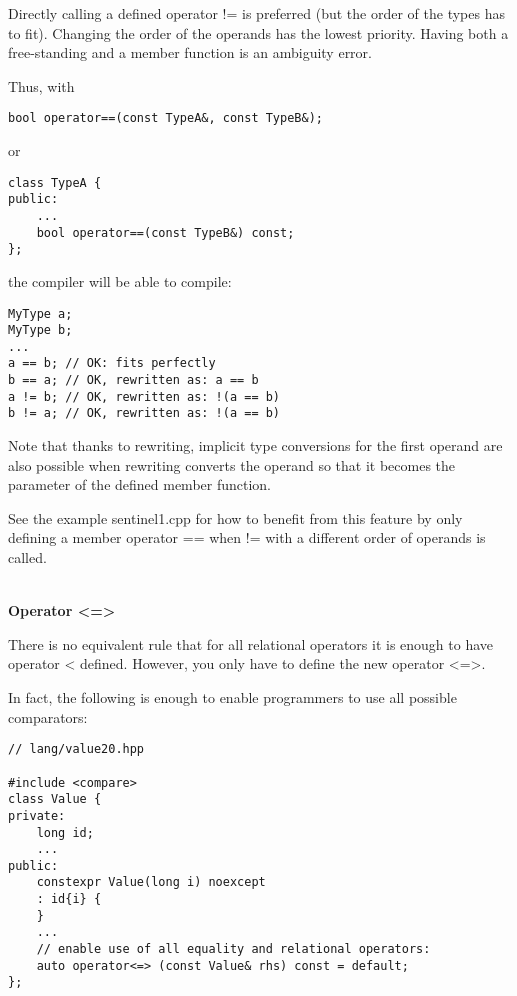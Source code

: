 Directly calling a defined operator != is preferred (but the order of the types has to fit). Changing the order of the operands has the lowest priority. Having both a free-standing and a member function is an ambiguity error.

Thus, with

\begin{lstlisting}[style=styleCXX]
bool operator==(const TypeA&, const TypeB&);
\end{lstlisting}

or

\begin{lstlisting}[style=styleCXX]
class TypeA {
public:
	...
	bool operator==(const TypeB&) const;
};
\end{lstlisting}

the compiler will be able to compile:

\begin{lstlisting}[style=styleCXX]
MyType a;
MyType b;
...
a == b; // OK: fits perfectly
b == a; // OK, rewritten as: a == b
a != b; // OK, rewritten as: !(a == b)
b != a; // OK, rewritten as: !(a == b)
\end{lstlisting}

Note that thanks to rewriting, implicit type conversions for the first operand are also possible when rewriting converts the operand so that it becomes the parameter of the defined member function.

See the example sentinel1.cpp for how to benefit from this feature by only defining a member operator == when != with a different order of operands is called.

\noindent
\hspace*{\fill} \\ %
\textbf{Operator <=>}

There is no equivalent rule that for all relational operators it is enough to have operator < defined. However, you only have to define the new operator <=>.

In fact, the following is enough to enable programmers to use all possible comparators:

\begin{lstlisting}[style=styleCXX]
// lang/value20.hpp

#include <compare>
class Value {
private:
	long id;
	...
public:
	constexpr Value(long i) noexcept
	: id{i} {
	}
	...
	// enable use of all equality and relational operators:
	auto operator<=> (const Value& rhs) const = default;
};
\end{lstlisting}

